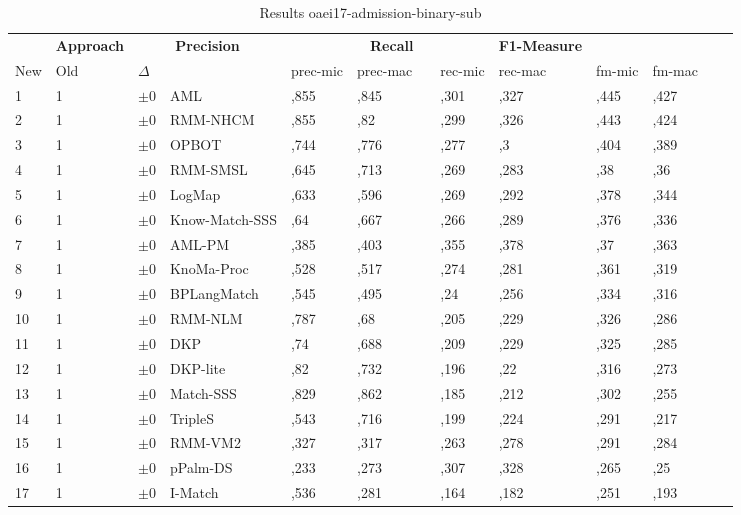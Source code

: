 \begin{table}[htb]
\setlength{\tabcolsep}{0.5em}
\centering
\scriptsize
\begin{tabular}[tb]{lllp{2.3cm}llllllllll}
\noalign{\smallskip}\hline\noalign{\smallskip}
\multicolumn{3}{c}{\textbf{Rank}}& \textbf{Approach}  & \multicolumn{2}{c}{\textbf{Precision}}  & \hspace*{1mm}  & \multicolumn{2}{c}{\textbf{Recall}}  & \hspace*{1mm}  & \multicolumn{2}{c}{\textbf{F1-Measure}}  & \hspace*{1mm} \\
New & Old & $\Delta$ & &prec-mic & prec-mac && rec-mic & rec-mac && fm-mic & fm-mac\\
\noalign{\smallskip}\hline\noalign{\smallskip}
1 & 1 		& $\pm$0 &AML    	&	,855 & ,845 & & ,301 & ,327 & & ,445 & ,427\\
2 & 1 		& $\pm$0 &RMM-NHCM    	&	,855 & ,82 & & ,299 & ,326 & & ,443 & ,424\\
3 & 1 		& $\pm$0 &OPBOT    	&	,744 & ,776 & & ,277 & ,3 & & ,404 & ,389\\
4 & 1 		& $\pm$0 &RMM-SMSL    	&	,645 & ,713 & & ,269 & ,283 & & ,38 & ,36\\
5 & 1 		& $\pm$0 &LogMap    	&	,633 & ,596 & & ,269 & ,292 & & ,378 & ,344\\
6 & 1 		& $\pm$0 &Know-Match-SSS    	&	,64 & ,667 & & ,266 & ,289 & & ,376 & ,336\\
7 & 1 		& $\pm$0 &AML-PM    	&	,385 & ,403 & & ,355 & ,378 & & ,37 & ,363\\
8 & 1 		& $\pm$0 &KnoMa-Proc    	&	,528 & ,517 & & ,274 & ,281 & & ,361 & ,319\\
9 & 1 		& $\pm$0 &BPLangMatch    	&	,545 & ,495 & & ,24 & ,256 & & ,334 & ,316\\
10 & 1 		& $\pm$0 &RMM-NLM    	&	,787 & ,68 & & ,205 & ,229 & & ,326 & ,286\\
11 & 1 		& $\pm$0 &DKP    	&	,74 & ,688 & & ,209 & ,229 & & ,325 & ,285\\
12 & 1 		& $\pm$0 &DKP-lite    	&	,82 & ,732 & & ,196 & ,22 & & ,316 & ,273\\
13 & 1 		& $\pm$0 &Match-SSS    	&	,829 & ,862 & & ,185 & ,212 & & ,302 & ,255\\
14 & 1 		& $\pm$0 &TripleS    	&	,543 & ,716 & & ,199 & ,224 & & ,291 & ,217\\
15 & 1 		& $\pm$0 &RMM-VM2    	&	,327 & ,317 & & ,263 & ,278 & & ,291 & ,284\\
16 & 1 		& $\pm$0 &pPalm-DS    	&	,233 & ,273 & & ,307 & ,328 & & ,265 & ,25\\
17 & 1 		& $\pm$0 &I-Match    	&	,536 & ,281 & & ,164 & ,182 & & ,251 & ,193\\
\end{tabular}
\caption{Results oaei17-admission-binary-sub}
\label{tbl:results}
\end{table}